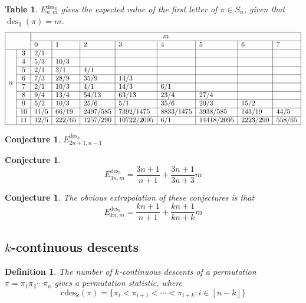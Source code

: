 \documentclass{article}
\newcommand{\n}[1]{\multicolumn{1}{|c|}{#1}}
\newtheorem{definition}[theo]{Definition}
\newtheorem{conjecture}[theo]{Conjecture}
\newtheorem{datatable}[theo]{Table}
\begin{document}
\begin{datatable} $E_{n,m}^{\text{des}_3}$ gives the expected value of the first letter of $\pi \in S_n$,
given that $\operatorname{des}_3(\pi) = m$.
  \[
    \begin{array}{|ll|l|l|l|l|l|l|l|l|}
    \hline
    & & \multicolumn{8}{|c|}{m} \\
    \cline{3-10}
    & & 0 & 1 & 2 & 3 & 4 & 5 & 6 & 7\\
    \hline
    \multirow{8}{*}{$n$}
    & \n{3}  & 2/1  &        &          &            &           &            &          &        \\ \cline{2-10}
    & \n{4}  & 5/3  & 10/3   &          &            &           &            &          &        \\ \cline{2-10}
    & \n{5}  & 2/1  & 3/1    & 4/1      &            &           &            &          &        \\ \cline{2-10}
    & \n{6}  & 7/3  & 28/9   & 35/9     & 14/3       &           &            &          &        \\ \cline{2-10}
    & \n{7}  & 2/1  & 10/3   & 4/1      & 14/3       & 6/1       &            &          &        \\ \cline{2-10}
    & \n{8}  & 9/4  & 13/4   & 54/13    & 63/13      & 23/4      & 27/4       &          &        \\ \cline{2-10}
    & \n{9}  & 5/2  & 10/3   & 25/6     & 5/1        & 35/6      & 20/3       & 15/2     &        \\ \cline{2-10}
    & \n{10} & 11/5 & 66/19  & 2497/585 & 7392/1475  & 8833/1475 & 3938/585   & 143/19   & 44/5   \\ \cline{2-10}
    & \n{11} & 12/5 & 222/65 & 1257/290 & 10722/2095 & 6/1       & 14418/2095 & 2223/290 & 558/65 \\ \hline
    \end{array}
  \]
\end{datatable}
\begin{conjecture}
  $E_{2n+1,n-1}^{\text{des}_3}$
\end{conjecture}
\begin{conjecture}
  \[
    E_{3n,m}^{\text{des}_3} = \frac{3n+1}{n+1} + \frac{3n+1}{3n+3}m
  \]
\end{conjecture}
\begin{conjecture}
  The obvious extrapolation of these conjectures is that \[
    E_{kn,m}^{\text{des}_k} = \frac{kn+1}{n+1} + \frac{kn+1}{kn+k}m
  \]
\end{conjecture}
\subsection{$k$-continuous descents}
\begin{definition}
  The number of $k$-continuous descents of a permutation $\pi = \pi_1\pi_2\cdots\pi_n$
  gives a permutation statistic, where \[
    \operatorname{cdes_k}(\pi) = \{\pi_i < \pi_{i+1} < \cdots < \pi_{i+k} : i \in [n-k]\}
  \]
\end{definition}
\end{document}
